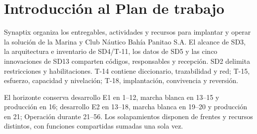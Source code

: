 \setcounter{chapter}{6}
\chapter{Introducción al Plan de trabajo}
Synaptix organiza los entregables, actividades y recursos para implantar y operar la solución de la Marina y Club Náutico Bahía Panitao S.A. El alcance de SD3, la arquitectura e inventario de SD4/T-11, los datos de SD5 y las cinco innovaciones de SD13 comparten códigos, responsables y recepción. SD2 delimita restricciones y habilitaciones. T-14 contiene diccionario, trazabilidad y red; T-15, esfuerzo, capacidad y nivelación; T-18, implantación, convivencia y reversión.

El horizonte conserva desarrollo E1 en 1--12, marcha blanca en 13--15 y producción en 16; desarrollo E2 en 13--18, marcha blanca en 19--20 y producción en 21; Operación durante 21--56. Los solapamientos disponen de frentes y recursos distintos, con funciones compartidas sumadas una sola vez.~\parencite[art.~17; Formularios T-14/T-15/T-18; pp.~12--64]{bases-admin}
\newpage


